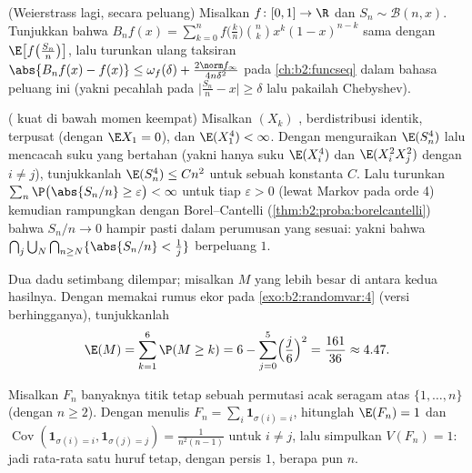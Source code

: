 \begin{exercise}[$\star\star\star$]\label{exo:b2:randomvar:8}
(Weierstrass lagi, secara peluang) Misalkan $f \colon [0,1] \to \R$
 dan $S_n \sim \mathcal{B}(n, x)$. Tunjukkan bahwa
 $B_nf(x) = \sum_{k=0}^n f\bigl(\frac
kn\bigr)\binom nk x^k(1-x)^{n-k}$ sama dengan
$\E\bigl[f\bigl(\frac{S_n}{n}\bigr)\bigr]$, lalu turunkan ulang
taksiran $\abs{B_nf(x) - f(x)} \leq \omega_f(\delta) +
\frac{2\norm f_\infty}{4n\delta^2}$ pada \cref{ch:b2:funcseq} dalam
bahasa peluang ini (yakni pecahlah pada $\bigl|\frac{S_n}{n} -
x\bigr| \geq \delta$ lalu pakailah Chebyshev).
\end{exercise}

\begin{exercise}[$\star\star\star$]\label{exo:b2:randomvar:9}
( kuat di bawah momen keempat) Misalkan $(X_k)$ ,
berdistribusi identik, terpusat (dengan $\E X_1 = 0$), dan
$\E(X_1^4) < \infty$. Dengan menguraikan $\E(S_n^4)$ lalu mencacah
suku yang bertahan (yakni hanya suku $\E(X_i^4)$ dan $\E(X_i^2X_j^2)$ dengan $i
\neq j$), tunjukkanlah $\E(S_n^4) \leq C n^2$ untuk sebuah konstanta $C$. Lalu turunkan
$\sum_n \P\bigl(\abs{S_n/n} \geq \varepsilon\bigr) < \infty$
untuk tiap $\varepsilon > 0$ (lewat Markov pada orde 4) kemudian rampungkan dengan
Borel--Cantelli (\cref{thm:b2:proba:borelcantelli}) bahwa
$S_n/n \to 0$ hampir pasti dalam perumusan yang sesuai: yakni bahwa
 $\bigcap_{j}\bigcup_N\bigcap_{n \geq N}\{\abs{S_n/n} <
\frac1j\}$ berpeluang $1$.
\end{exercise}

\begin{exercise}[$\star$]\label{exo:b2:randomvar:10}
Dua dadu setimbang dilempar; misalkan $M$ yang lebih besar di antara kedua
hasilnya. Dengan memakai rumus ekor pada \cref{exo:b2:randomvar:4}
(versi berhingganya), tunjukkanlah
\[
\E(M) = \sum_{k=1}^{6}\P(M \geq k)
= 6 - \sum_{j=0}^5\Bigl(\frac j6\Bigr)^2 = \frac{161}{36}
\approx 4.47 .
\]
\end{exercise}

\begin{exercise}[$\star\star$]\label{exo:b2:randomvar:11}
Misalkan $F_n$ banyaknya titik tetap sebuah permutasi acak seragam
atas $\{1, \dots, n\}$ (dengan $n \geq 2$). Dengan menulis $F_n =
\sum_i\mathbf 1_{\sigma(i) = i}$, hitunglah $\E(F_n) = 1$ dan
$\operatorname{Cov}(\mathbf 1_{\sigma(i)=i}, \mathbf
1_{\sigma(j)=j}) = \frac1{n^2(n-1)}$ untuk $i \neq j$, lalu
simpulkan $V(F_n) = 1$: jadi rata-rata satu huruf tetap, dengan
 persis $1$, berapa pun $n$.
\end{exercise}

